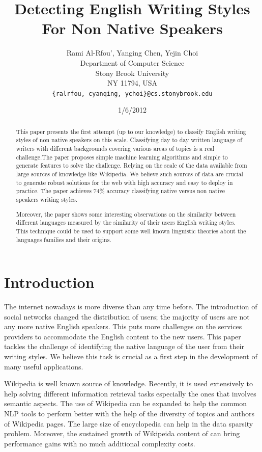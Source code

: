 \documentclass[11pt]{article}
\title{Detecting English Writing Styles For Non Native Speakers}
\author{Rami Al-Rfou', Yanging Chen, Yejin Choi \\
  Department of Computer Science \\
  Stony Brook University \\
  NY 11794, USA \\
  {\tt \{ralrfou, cyanqing, ychoi\}@cs.stonybrook.edu}}
\date{1/6/2012}
\begin{document}
\maketitle
\begin{abstract}
This paper presents the first attempt (up to our knowledge) to classify English writing styles of non native speakers on this scale. Classifying day to day written language of writers with different backgrounds covering various areas of topics is a real challenge.The paper proposes simple machine learning algorithms and simple to generate features to solve the challenge. Relying on the scale of the data available from large sources of knowledge like Wikipedia. We believe such sources of data are crucial to generate robust solutions for the web with high accuracy and easy to deploy in practice. The paper achieves 74\% accuracy classifying native versus non native speakers writing styles.

Moreover, the paper shows some interesting observations on the similarity between different languages measured by the similarity of their users English writing styles. This technique could be used to support some well known linguistic theories about the languages families and their origins.
\end{abstract}



\section{Introduction}
The internet nowadays is more diverse than any time before. The introduction of social networks changed the distribution of users; the majority of users are not any more native English speakers. This puts more challenges on the services providers to accommodate the English content to the new users. This paper tackles the challenge of identifying the native language of the user from their writing styles. We believe this task is crucial as a first step in the development of many useful applications.

Wikipedia is well known source of knowledge. Recently, it is used extensively to help solving different information retrieval tasks especially the ones that involves semantic aspects. The use of Wikipedia can be expanded to help the common NLP tools to perform better with the help of the diversity of topics and authors of Wikipedia pages. The large size of encyclopedia can help in the data sparsity problem. Moreover, the sustained growth of Wikipeida content of can bring performance gains with no much additional complexity costs.
\end{document}
